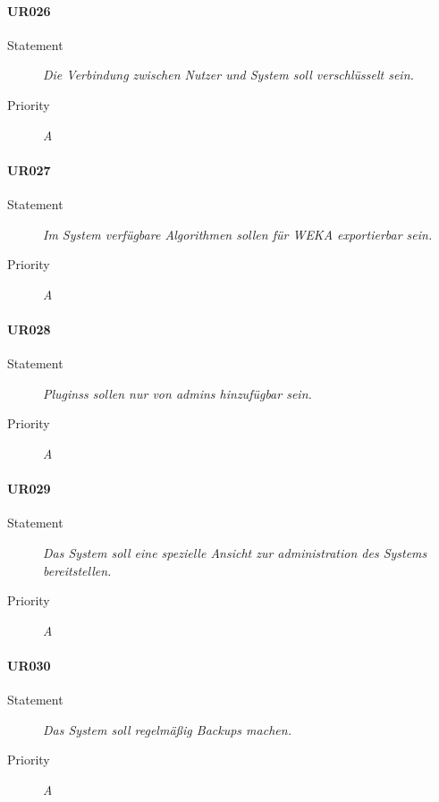 \paragraph{UR026}
\begin{description}
\item[Statement] \textit{Die Verbindung zwischen Nutzer und System soll verschlüsselt sein.}
\item[Priority] \textit{A}
\end{description}

\paragraph{UR027}
\begin{description}
\item[Statement] \textit{Im System verfügbare Algorithmen sollen für WEKA exportierbar sein.}
\item[Priority] \textit{A}
\end{description}

\paragraph{UR028}
\begin{description}
\item[Statement] \textit{\glspl{Plugins} sollen nur von \glspl{admin} hinzufügbar sein.}
\item[Priority] \textit{A}
\end{description}

\paragraph{UR029}
\begin{description}
\item[Statement] \textit{Das System soll eine spezielle Ansicht zur administration des Systems bereitstellen.}
\item[Priority] \textit{A}
\end{description}

\paragraph{UR030}
\begin{description}
\item[Statement] \textit{Das System soll regelmäßig \glspl{Backup} machen.}%
\item[Priority] \textit{A}
\end{description}


